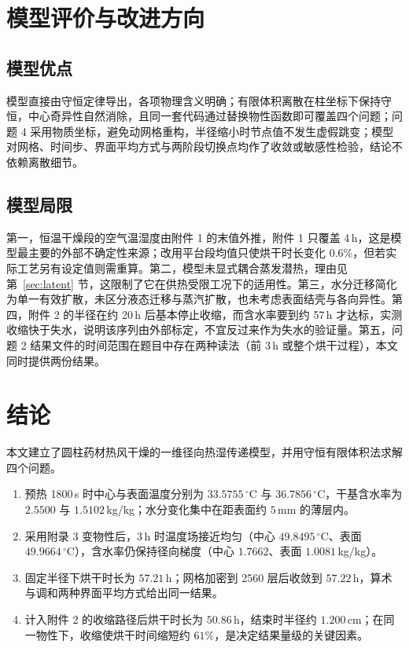 \documentclass[12pt,a4paper]{ctexart}
\begin{document}
\section{模型评价与改进方向}

\subsection{模型优点}

模型直接由守恒定律导出，各项物理含义明确；有限体积离散在柱坐标下保持守恒，中心奇异性自然消除，且同一套代码通过替换物性函数即可覆盖四个问题；问题 4 采用物质坐标，避免动网格重构，半径缩小时节点值不发生虚假跳变；模型对网格、时间步、界面平均方式与两阶段切换点均作了收敛或敏感性检验，结论不依赖离散细节。

\subsection{模型局限}

第一，恒温干燥段的空气温湿度由附件 1 的末值外推，附件 1 只覆盖 4\,h，这是模型最主要的外部不确定性来源；改用平台段均值只使烘干时长变化 $0.6\%$，但若实际工艺另有设定值则需重算。第二，模型未显式耦合蒸发潜热，理由见第~\ref{sec:latent} 节，这限制了它在供热受限工况下的适用性。第三，水分迁移简化为单一有效扩散，未区分液态迁移与蒸汽扩散，也未考虑表面结壳与各向异性。第四，附件 2 的半径在约 20\,h 后基本停止收缩，而含水率要到约 57\,h 才达标，实测收缩快于失水，说明该序列由外部标定，不宜反过来作为失水的验证量。第五，问题 2 结果文件的时间范围在题目中存在两种读法（前 3\,h 或整个烘干过程），本文同时提供两份结果。

\section{结论}

本文建立了圆柱药材热风干燥的一维径向热湿传递模型，并用守恒有限体积法求解四个问题。

\begin{enumerate}
\item 预热 1800\,s 时中心与表面温度分别为 $33.5755\,^\circ$C 与 $36.7856\,^\circ$C，干基含水率为 $2.5500$ 与 $1.5102$\,kg/kg；水分变化集中在距表面约 $5$\,mm 的薄层内。
\item 采用附录 3 变物性后，3\,h 时温度场接近均匀（中心 $49.8495\,^\circ$C、表面 $49.9664\,^\circ$C），含水率仍保持径向梯度（中心 $1.7662$、表面 $1.0081$\,kg/kg）。
\item 固定半径下烘干时长为 $57.21$\,h；网格加密到 2560 层后收敛到 $57.22$\,h，算术与调和两种界面平均方式给出同一结果。
\item 计入附件 2 的收缩路径后烘干时长为 $50.86$\,h，结束时半径约 $1.200$\,cm；在同一物性下，收缩使烘干时间缩短约 $61\%$，是决定结果量级的关键因素。
\end{enumerate}
\end{document}
